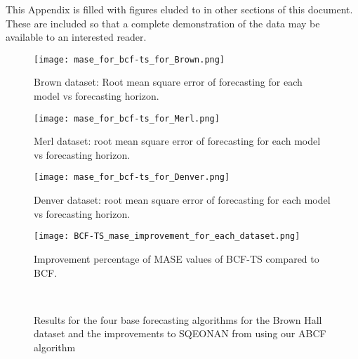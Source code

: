 \label{app:results}

This Appendix is filled with figures eluded to in other sections of this document.  These are included so that a complete demonstration of the data may be available to an interested reader.



\begin{figure}[!ht]
	\begin{center}
		\texttt{[image: mase\_for\_bcf-ts\_for\_Brown.png]}
	\end{center}
	\caption{Brown dataset: Root mean square error of forecasting for each model vs forecasting horizon.}
	\label{fig:rmseplotbrown}
\end{figure}


\begin{figure}[!ht]
	\begin{center}
		\texttt{[image: mase\_for\_bcf-ts\_for\_Merl.png]}
	\end{center}
	\caption{Merl dataset: root mean square error of forecasting for each model vs forecasting horizon.}
	\label{fig:maseplotmerl}
\end{figure}

\begin{figure}[!ht]
	\begin{center}
		\texttt{[image: mase\_for\_bcf-ts\_for\_Denver.png]}
	\end{center}
	\caption{Denver dataset: root mean square error of forecasting for each model vs forecasting horizon.}
	\label{fig:maseplotdenver}
\end{figure}

\begin{figure}[!ht]
	\begin{center}
		\texttt{[image: BCF-TS\_mase\_improvement\_for\_each\_dataset.png]}
	\end{center}
	\caption{Improvement percentage of MASE values of BCF-TS compared to BCF.}
	\label{fig:bcftsmaseimprovement}
\end{figure}


\begin{figure}[!h]
	\begin{center}
		 \\
	\end{center}
	\caption{Results for the four base forecasting algorithms for the Brown Hall dataset and the improvements to SQEONAN from using our ABCF algorithm}
	\label{fig:sqe_merl_results}
\end{figure}

